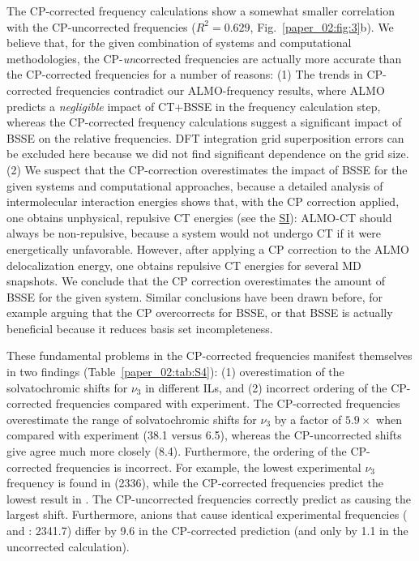 \documentclass[%
  class = book,%
  crop = false,%
  float = true,%
  multi = true,%
  preview = false,%
]{standalone}
\begin{document}
The CP-corrected frequency calculations show a somewhat smaller correlation with the CP-uncorrected frequencies (\(R^2 = 0.629\), Fig.~\ref{paper_02:fig:3}b). We believe that, for the given combination of systems and computational methodologies, the CP-\emph{un}corrected frequencies are actually more accurate than the CP-corrected frequencies for a number of reasons: (1) The trends in CP-corrected frequencies contradict our ALMO-frequency results, where ALMO predicts a \emph{negligible} impact of CT+BSSE in the frequency calculation step, whereas the CP-corrected frequency calculations suggest a significant impact of BSSE on the relative frequencies. DFT integration grid superposition errors can be excluded here because we did not find significant dependence on the grid size. (2) We suspect that the CP-correction overestimates the impact of BSSE for the given systems and computational approaches, because a detailed analysis of intermolecular interaction energies shows that, with the CP correction applied, one obtains unphysical, repulsive CT energies (see the \hyperref[paper_02:sec:SI]{SI}): ALMO-CT should always be non-repulsive, because a system would not undergo CT if it were energetically unfavorable. However, after applying a CP correction to the ALMO delocalization energy, one obtains repulsive CT energies for several MD snapshots. We conclude that the CP correction overestimates the amount of BSSE for the given system. Similar conclusions have been drawn before, for example arguing\cite{Collins1986} that the CP overcorrects for BSSE, or that BSSE is actually beneficial because it reduces basis set incompleteness.\cite{Mentel2014}

These fundamental problems in the CP-corrected frequencies manifest themselves in two findings (Table~\ref{paper_02:tab:S4}): (1) overestimation of the solvatochromic shifts for \(\nu_{3}\) in different ILs, and (2) incorrect ordering of the CP-corrected frequencies compared with experiment. The CP-corrected frequencies overestimate the range of solvatochromic shifts for \(\nu_{3}\) by a factor of \(5.9 \times\) when compared with experiment (\SI{38.1}{\wavenumber} versus \SI{6.5}{\wavenumber}), whereas the CP-uncorrected shifts give agree much more closely (\SI{8.4}{\wavenumber}). Furthermore, the ordering of the CP-corrected frequencies is incorrect. For example, the lowest experimental \(\nu_{3}\) frequency is found in \ce{[C4C1im][SCN]} (\SI{2336}{\wavenumber}), while the CP-corrected frequencies predict the lowest result in \ce{[C4C1im][DCA]}. The CP-uncorrected frequencies correctly predict \ce{[SCN]-} as causing the largest shift. Furthermore, anions that cause identical experimental frequencies (\ce{[Tf2N]-} and \ce{[BF4]-}: \SI{2341.7}{\wavenumber}) differ by \SI{9.6}{\wavenumber} in the CP-corrected prediction (and only by \SI{1.1}{\wavenumber} in the uncorrected calculation).
\end{document}
